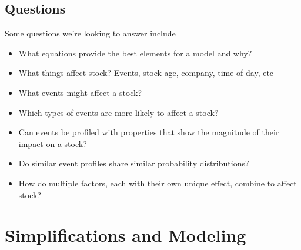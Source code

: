 \documentclass{article}
\begin{document}
\subsection{Questions}

Some questions we're looking to answer include
\begin{itemize}
	\item What equations provide the best elements for a model and why?
    \item What things affect stock? Events, stock age, company, time of day, etc
    \item What events might affect a stock?
    \item Which types of events are more likely to affect a stock?
    \item Can events be profiled with properties that show the magnitude of their impact on a stock?
    \item Do similar event profiles share similar probability distributions?
    \item How do multiple factors, each with their own unique effect, combine to affect stock?
\end{itemize}

\section{Simplifications and Modeling}
\end{document}
